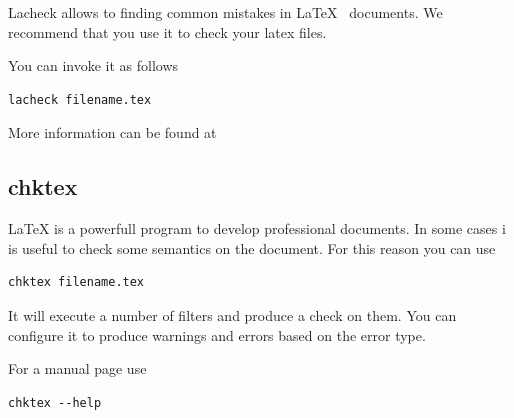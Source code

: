 Lacheck allows to finding common mistakes in \LaTeX~
documents. We recommend that you use it to check your latex files.

You can invoke it as follows

\begin{lstlisting}
lacheck filename.tex
\end{lstlisting}

More information can be found at


\subsection{chktex}
\label{s:chktex}

LaTeX is a powerfull program to develop professional documents. In
some cases i is useful to check some semantics on the document. For
this reason you can use 

\begin{lstlisting}
chktex filename.tex
\end{lstlisting}

It will execute a number of filters and produce a check on them. You
can configure it to produce warnings and errors based on the error
type.

For a manual page use

\begin{lstlisting}
chktex --help
\end{lstlisting}

